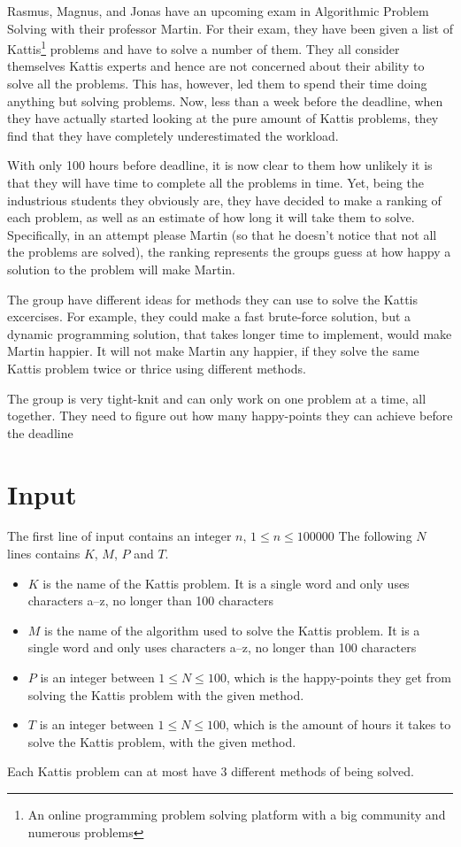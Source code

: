 Rasmus, Magnus, and Jonas have an upcoming exam in Algorithmic Problem Solving with their professor Martin. For their exam, they have been given a list of Kattis\footnote{An online programming problem solving platform with a big community and numerous problems} problems and have to solve a number of them. They all consider themselves Kattis experts and hence are not concerned about their ability to solve all the problems. This has, however, led them to spend their time doing anything but solving problems. Now, less than a week before the deadline, when they have actually started looking at the pure amount of Kattis problems, they find that they have completely underestimated the workload.

With only 100 hours before deadline, it is now clear to them how unlikely it is that they will have time to complete all the problems in time. Yet, being the industrious students they obviously are, they have decided to make a ranking of each problem, as well as an estimate of how long it will take them to solve. Specifically, in an attempt please Martin (so that he doesn't notice that not all the problems are solved), the ranking represents the groups guess at how happy a solution to the problem will make Martin. 

The group have different ideas for methods they can use to solve the Kattis excercises. For example, they could make a fast brute-force solution, but a dynamic programming solution, that takes longer time to implement, would make Martin happier. It will not make Martin any happier, if they solve the same Kattis problem twice or thrice using different methods. 

The group is very tight-knit and can only work on one problem at a time, all together. They need to figure out how many happy-points they can achieve before the deadline

\section*{Input}
The first line of input contains an integer $n$, $1\leq n\leq 100000$
The following $N$ lines contains $K$, $M$, $P$ and $T$. 
\begin{itemize}
    \item $K$ is the name of the Kattis problem. It is a single word and only uses characters a–z, no longer than 100 characters
    \item  $M$ is the name of the algorithm used to solve the Kattis problem. It is a single word and only uses characters a–z, no longer than 100 characters
    \item  $P$ is an integer between $1\leq N\leq 100$, which is the happy-points they get from solving the Kattis problem with the given method.
    \item $T$ is an integer between $1\leq N\leq 100$, which is the amount of hours it takes to solve the Kattis problem, with the given method.
\end{itemize}
Each Kattis problem can at most have 3 different methods of being solved.


